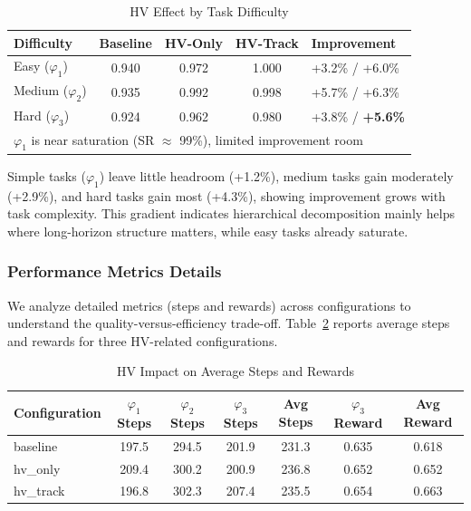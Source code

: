 \documentclass[journal]{IEEEtran}
\begin{document}
\begin{table}[t]
\centering
\caption{HV Effect by Task Difficulty}
\label{tab:difficulty_impact}
\begin{tabular}{@{}lcccl@{}}
	\toprule
	\textbf{Difficulty} & \textbf{Baseline} & \textbf{HV-Only} & \textbf{HV-Track} & \textbf{Improvement} \\ \midrule
Easy ($\varphi_1$) & 0.940 & 0.972 & 1.000 & +3.2\% / +6.0\% \\
Medium ($\varphi_2$) & 0.935 & 0.992 & 0.998 & +5.7\% / +6.3\% \\
Hard ($\varphi_3$) & 0.924 & 0.962 & 0.980 & +3.8\% / \textbf{+5.6\%} \\ \bottomrule
\multicolumn{5}{l}{\footnotesize *$\varphi_1$ is near saturation (SR $\approx$ 99\%), limited improvement room}
\end{tabular}
\end{table}

Simple tasks ($\varphi_1$) leave little headroom (+1.2\%), medium tasks gain moderately (+2.9\%), and hard tasks gain most (+4.3\%), showing improvement grows with task complexity. This gradient indicates hierarchical decomposition mainly helps where long-horizon structure matters, while easy tasks already saturate.

\subsubsection{Performance Metrics Details}

We analyze detailed metrics (steps and rewards) across configurations to understand the quality-versus-efficiency trade-off. Table~\ref{tab:hv-steps-rewards} reports average steps and rewards for three HV-related configurations.

\begin{table}[t]
\centering
\caption{HV Impact on Average Steps and Rewards}
\label{tab:hv-steps-rewards}
\begin{tabular}{@{}lcccccc@{}}
	\toprule
	\textbf{Configuration} & \textbf{$\varphi_1$ Steps} & \textbf{$\varphi_2$ Steps} & \textbf{$\varphi_3$ Steps} & \textbf{Avg Steps} & \textbf{$\varphi_3$ Reward} & \textbf{Avg Reward} \\ \midrule
baseline & 197.5 & 294.5 & 201.9 & 231.3 & 0.635 & 0.618 \\
hv\_only & 209.4 & 300.2 & 200.9 & 236.8 & 0.652 & 0.652 \\
hv\_track & 196.8 & 302.3 & 207.4 & 235.5 & 0.654 & 0.663 \\ \bottomrule
\end{tabular}
\end{table}
\end{document}
